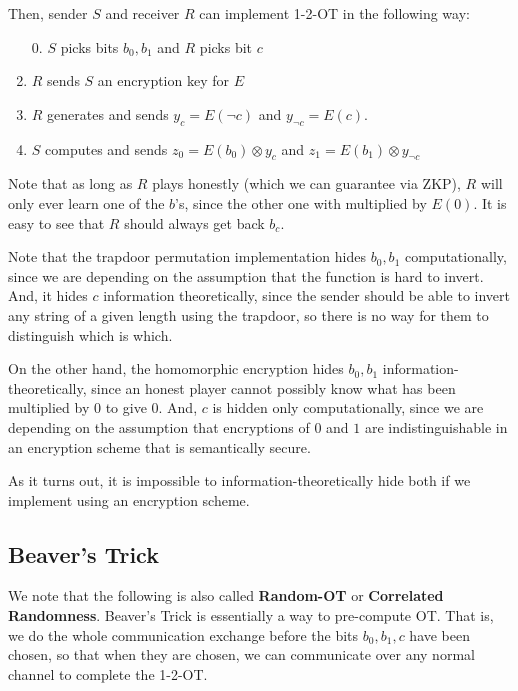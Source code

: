 \documentclass[11pt]{article}
\newcommand{\tb}{\textbf}
\begin{document}
Then, sender \(S\) and receiver \(R\) can implement 1-2-OT in the following way:
\begin{enumerate}
\item [0.] \(S\) picks bits \(b_0,b_1\) and \(R\) picks bit \(c\)
\item \(R\) sends \(S\) an encryption key for \(E\)
\item \(R\) generates and sends \(y_c = E(\neg c)\) and \(y_{\neg c} = E(c)\).
\item \(S\) computes and sends \(z_0 = E(b_0)\otimes y_c\) and \(z_1 = E(b_1)\otimes y_{\neg c}\)
\end{enumerate}
Note that as long as \(R\) plays honestly (which we can guarantee via ZKP),
\(R\) will only ever learn one of the \(b\)'s, since the other one with multiplied by \(E(0)\).
It is easy to see that \(R\) should always get back \(b_c\).\bigskip

Note that the trapdoor permutation implementation hides \(b_0,b_1\) computationally,
since we are depending on the assumption that the function is hard to invert.
And, it hides \(c\) information theoretically, since the sender should be able to invert any
string of a given length using the trapdoor, so there is no way for them to distinguish which is which.\medskip

On the other hand, the homomorphic encryption hides \(b_0,b_1\) information-theoretically, 
since an honest player cannot possibly know what has been multiplied by \(0\) to give \(0\).
And, \(c\) is hidden only computationally, since we are depending on the assumption that
encryptions of \(0\) and \(1\) are indistinguishable in an encryption scheme that is semantically secure.\medskip

As it turns out, it is impossible to information-theoretically hide both if we implement using an encryption scheme.

\subsection{Beaver's Trick}
We note that the following is also called \tb{Random-OT} or \tb{Correlated Randomness}.
Beaver's Trick is essentially a way to pre-compute OT.
That is, we do the whole communication exchange before the bits \(b_0,b_1,c\) have been chosen,
so that when they are chosen, we can communicate over any normal channel to complete the 1-2-OT.\smallskip
\end{document}
